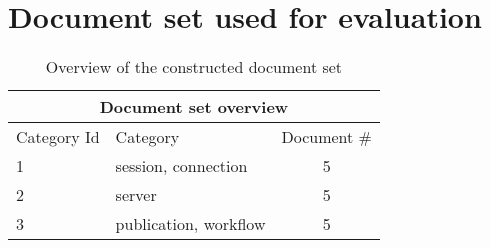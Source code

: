 \chapter{Document set used for evaluation}
\label{document_set_tables}

\begin{table}[H]
\centering
\begin{tabular}{l l  c}
\hline
\multicolumn{3}{c}{Document set overview}\\
\hline
Category Id & Category & Document \# \\
\hline
1 & session, connection & 5 \\
2 & server & 5 \\
3 & publication, workflow & 5 \\
\hline
\end{tabular}
\caption[Document set overview]{Overview of the constructed document set}
\end{table}

\pagebreak

